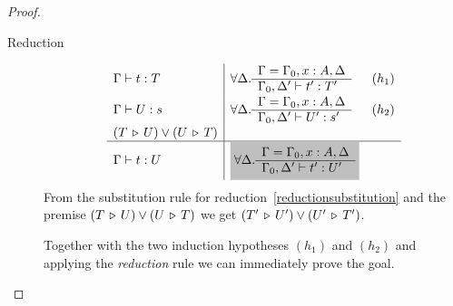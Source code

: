 \documentclass[12pt]{article}
\begin{document}
\begin{theorem}
\begin{proof}
\begin{description}
    \item[Reduction]
      $$
      \begin{array}{l|ll}
        \Gamma \vdash t:T
        & \forall \Delta .
          \rulev
          {\Gamma = \Gamma_0,x:A,\Delta}
          {\Gamma_0,\Delta' \vdash t': T'} & (h_1)
        \\
        \Gamma \vdash U: s
        & \forall \Delta .
          \rulev
          {\Gamma = \Gamma_0,x:A,\Delta}
          {\Gamma_0,\Delta' \vdash U': s'} & (h_2)
        \\
        (T \reduce U) \lor (U \reduce T)
        \\
        \hline %
        \Gamma \vdash t:U
        & \goalbg{
          \forall \Delta .
          \rulev
          {\Gamma = \Gamma_0,x:A,\Delta}
          {\Gamma_0,\Delta' \vdash t': U'}
          }
      \end{array}
      $$
      From the substitution rule for reduction~\ref{reductionsubstitution} and
      the premise $(T \,\triangleright\, U) \lor (U \,\triangleright\, T)$ we get
      $(T' \,\triangleright\, U') \lor (U' \,\triangleright\, T')$.

      Together with the two induction hypotheses $(h_1)$ and $(h_2)$ and
      applying the \emph{reduction} rule we can immediately prove the goal.
    \end{description}
  \end{proof}
\end{theorem}
\end{document}
